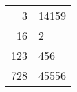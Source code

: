 \documentclass{article}
\begin{document}
             \begin{tabular}{r@{.}l}
                                   3  & 14159 \\
                                   16  & 2     \\
                                  123 & 456  \\
                                  728 & 45556 
             \end{tabular}
   
\end{document}
